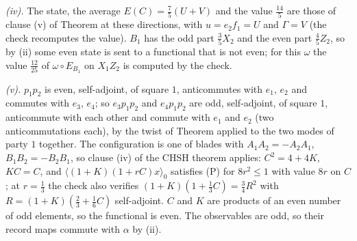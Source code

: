 \emph{(iv).} The state, the average $E(C) = \tfrac75(U + V)$ and the value $\tfrac{14}{5}$ are those of clause (v) of Theorem  at these directions, with $u = e_{2}f_{1} = U$ and $\Gamma = V$ (the check recomputes the value). $B_{1}$ has the odd part $\tfrac35X_{2}$ and the even part $\tfrac45Z_{2}$, so by (ii) some even state is sent to a functional that is not even; for this $\omega$ the value $\tfrac{12}{25}$ of $\omega \circ E_{B_{1}}$ on $X_{1}Z_{2}$ is computed by the check.

\emph{(v).} $p_{1}p_{2}$ is even, self-adjoint, of square $1$, anticommutes with $e_{1}$, $e_{2}$ and commutes with $e_{3}$, $e_{4}$; so $e_{3}p_{1}p_{2}$ and $e_{4}p_{1}p_{2}$ are odd, self-adjoint, of square $1$, anticommute with each other and commute with $e_{1}$ and $e_{2}$ (two anticommutations each), by the twist of Theorem  applied to the two modes of party $1$ together. The configuration is one of blades with $A_{1}A_{2} = -A_{2}A_{1}$, $B_{1}B_{2} = -B_{2}B_{1}$, so clause (iv) of the CHSH theorem applies: $C^{2} = 4 + 4K$, $KC = C$, and $\langle(1 + K)(1 + rC)x\rangle_{0}$ satisfies (P) for $8r^{2} \le 1$ with value $8r$ on $C$; at $r = \tfrac13$ the check also verifies $(1 + K)(1 + \tfrac13C) = \tfrac34R^{2}$ with $R = (1 + K)(\tfrac23 + \tfrac16C)$ self-adjoint. $C$ and $K$ are products of an even number of odd elements, so the functional is even. The observables are odd, so their record maps commute with $\alpha$ by (ii).
